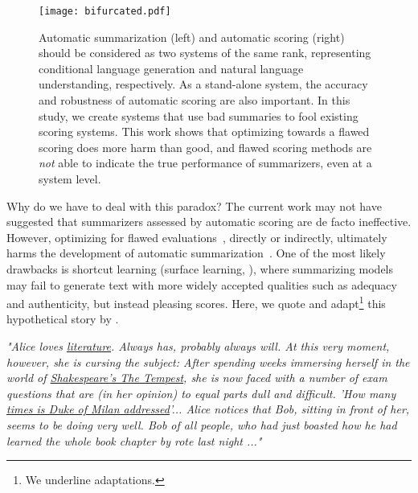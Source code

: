 \documentclass[11pt]{article}
\theoremstyle{remark}
\begin{document}
\begin{figure}[t]
    \centering
    \texttt{[image: bifurcated.pdf]}
    \caption{Automatic summarization (left) and automatic scoring (right) should be considered as two systems of the same rank, representing conditional language generation and natural language understanding, respectively. As a stand-alone system, the accuracy and robustness of automatic scoring are also important. In this study, we create systems that use bad summaries to fool existing scoring systems. This work shows that optimizing towards a flawed scoring does more harm than good, and flawed scoring methods are \emph{not} able to indicate the true performance of summarizers, even at a system level.}
    \label{fig:robots}
\end{figure}

Why do we have to deal with this paradox? The current work may not have suggested that summarizers assessed by automatic scoring are de facto ineffective. However, optimizing for flawed evaluations~\cite{gehrmann-etal-2021-gem,peyrard-etal-2017-learning}, directly or indirectly, ultimately harms the development of automatic summarization~\cite{narayan-etal-2018-ranking,kryscinski-etal-2019-neural,paulus2018a}. One of the most likely drawbacks is shortcut learning (surface learning, \citealp{geirhos2020shortcut}), where summarizing models may fail to generate text with more widely accepted qualities such as adequacy and authenticity, but instead pleasing scores. Here, we quote and adapt\footnote{We underline adaptations.} this hypothetical story by \citeauthor{geirhos2020shortcut}.

\textit{"Alice loves \underline{literature}. Always has, probably always will. At this very moment, however, she is cursing the subject: After spending weeks immersing herself in the world of \underline{Shakespeare's The Tempest}, she is now faced with a number of exam questions that are (in her opinion) to equal parts dull and difficult. 'How many \underline{times is Duke of Milan addressed}'... Alice notices that Bob, sitting in front of her, seems to be doing very well. Bob of all people, who had just boasted how he had learned the whole book chapter by rote last night ..."}
\end{document}
